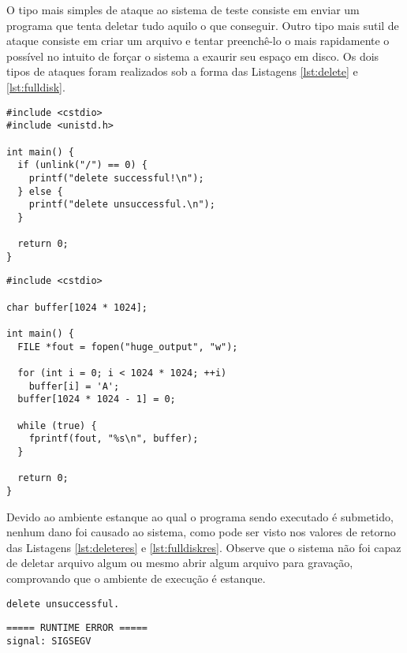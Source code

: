 \documentclass[ruledheader, 12pt]{abnt}
\begin{document}
O tipo mais simples de ataque ao sistema de teste consiste em enviar um programa que tenta deletar tudo aquilo o que conseguir. Outro tipo mais sutil de ataque consiste em criar um arquivo e tentar preenchê-lo o mais rapidamente o possível no intuito de forçar o sistema a exaurir seu espaço em disco. Os dois tipos de ataques foram realizados sob a forma das Listagens \ref{lst:delete} e \ref{lst:fulldisk}.

\begin{lstlisting}[float=bp, label=lst:delete, caption=Código C++ que tenta deletar o sistema]
#include <cstdio>
#include <unistd.h>

int main() {
  if (unlink("/") == 0) {
    printf("delete successful!\n");
  } else {
    printf("delete unsuccessful.\n");
  }

  return 0;
}
\end{lstlisting}

\begin{lstlisting}[float=tp, label=lst:fulldisk, caption=Código C++ que tenta preencher todo o espaço em disco]
#include <cstdio>

char buffer[1024 * 1024];

int main() {
  FILE *fout = fopen("huge_output", "w");

  for (int i = 0; i < 1024 * 1024; ++i)
    buffer[i] = 'A';
  buffer[1024 * 1024 - 1] = 0;

  while (true) {
    fprintf(fout, "%s\n", buffer);
  }

  return 0;
}
\end{lstlisting}

Devido ao ambiente estanque ao qual o programa sendo executado é submetido, nenhum dano foi causado ao sistema, como pode ser visto nos valores de retorno das Listagens \ref{lst:deleteres} e \ref{lst:fulldiskres}. Observe que o sistema não foi capaz de deletar arquivo algum ou mesmo abrir algum arquivo para gravação, comprovando que o ambiente de execução é estanque.

\begin{lstlisting}[float=tp, label=lst:deleteres, caption=Erro proveniente da tentativa de deletar o sistema]
delete unsuccessful.
\end{lstlisting}

\begin{lstlisting}[float=tp, label=lst:fulldiskres, caption=Erro proveniente da tentativa de preencher o espaço em disco do sistema]
===== RUNTIME ERROR =====
signal: SIGSEGV
\end{lstlisting}
\end{document}
